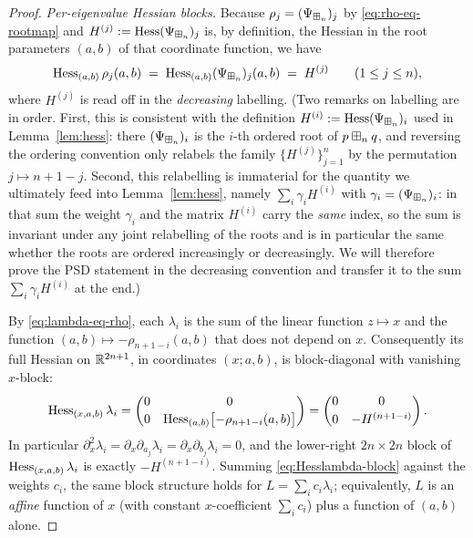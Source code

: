 \begin{proof}
\smallskip\noindent\emph{Per-eigenvalue Hessian blocks.}
Because $\rho_j=(\Psi_{\boxplus_n})_j$ by \eqref{eq:rho-eq-rootmap} and
$H^{(j)}:=\operatorname{Hess}(\Psi_{\boxplus_n})_j$ is, by definition, the Hessian in the root
parameters $(a,b)$ of that coordinate function, we have
\[
\operatorname{Hess}_{(a,b)}\rho_j(a,b)\;=\;\operatorname{Hess}_{(a,b)}(\Psi_{\boxplus_n})_j(a,b)\;=\;H^{(j)}\qquad(1\le j\le n),
\]
where $H^{(j)}$ is read off in the \emph{decreasing} labelling. (Two remarks on
labelling are in order. First, this is consistent with the definition
$H^{(i)}:=\operatorname{Hess}(\Psi_{\boxplus_n})_i$ used in Lemma~\ref{lem:hess}: there
$(\Psi_{\boxplus_n})_i$ is the $i$-th ordered root of $p\boxplus_n q$, and reversing
the ordering convention only relabels the family $\{H^{(j)}\}_{j=1}^n$ by the
permutation $j\mapsto n+1-j$. Second, this relabelling is immaterial for the
quantity we ultimately feed into Lemma~\ref{lem:hess}, namely
$\sum_i\gamma_i H^{(i)}$ with $\gamma_i=(\Psi_{\boxplus_n})_i$: in that sum the
weight $\gamma_i$ and the matrix $H^{(i)}$ carry the \emph{same} index, so the
sum is invariant under any joint relabelling of the roots and is in particular
the same whether the roots are ordered increasingly or decreasingly. We will
therefore prove the PSD statement in the decreasing convention and transfer it
to the sum $\sum_i\gamma_iH^{(i)}$ at the end.)

By \eqref{eq:lambda-eq-rho}, each $\lambda_i$ is the sum of the linear function
$z\mapsto x$ and the function $(a,b)\mapsto-\rho_{n+1-i}(a,b)$ that does not
depend on $x$. Consequently its full Hessian on $\mathbb{R}^{2n+1}$, in coordinates
$(x;a,b)$, is block-diagonal with vanishing $x$-block:
\begin{equation}\label{eq:Hesslambda-block}
\operatorname{Hess}_{(x,a,b)}\lambda_i
=\begin{pmatrix}0 & 0\\[2pt] 0 & \operatorname{Hess}_{(a,b)}\bigl[-\rho_{n+1-i}(a,b)\bigr]\end{pmatrix}
=\begin{pmatrix}0 & 0\\[2pt] 0 & -H^{(n+1-i)}\end{pmatrix}.
\end{equation}
In particular $\partial_x^2\lambda_i=\partial_x\partial_{a_j}\lambda_i
=\partial_x\partial_{b_j}\lambda_i=0$, and the lower-right $2n\times2n$ block of
$\operatorname{Hess}_{(x,a,b)}\lambda_i$ is exactly $-H^{(n+1-i)}$. Summing
\eqref{eq:Hesslambda-block} against the weights $c_i$, the same block structure
holds for $L=\sum_i c_i\lambda_i$; equivalently, $L$ is an \emph{affine} function
of $x$ (with constant $x$-coefficient $\sum_i c_i$) plus a function of $(a,b)$
alone.


\end{proof}
